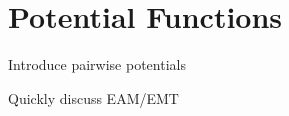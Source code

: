 \section{Potential Functions}
\label{sec:potentials}

\bit
\item Introduce pairwise potentials
\item Quickly discuss EAM/EMT
\eit
